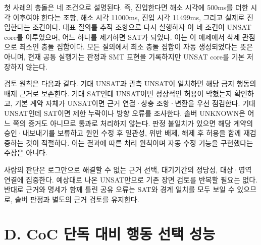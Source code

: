 \documentclass[11pt,a4paper]{article}
\begin{document}
첫 사례의 충돌은 네 조건으로 설명된다. 즉, 진입한다면 해소 시각에 500ms를 더한 시각 이후여야 한다는 조항, 해소 시각 11000ms, 진입 시각 11499ms, 그리고 실제로 진입한다는 조건이다. 대표 질의를 추적 조항으로 다시 실행하자 이 네 조건이 UNSAT core를 이루었으며, 어느 하나를 제거하면 SAT가 되었다. 이는 이 예제에서 삭제 관점으로 최소인 충돌 집합이다. 모든 질의에서 최소 충돌 집합이 자동 생성되었다는 뜻은 아니며, 현재 공통 실행기는 판정과 SMT 표현을 기록하지만 UNSAT core를 기본 저장하지 않는다.\par

검토 원칙은 다음과 같다. 기대 UNSAT과 관측 UNSAT이 일치하면 해당 금지 행동의 배제 근거로 보존한다. 기대 SAT인데 UNSAT이면 정상적인 허용이 막혔는지 확인하고, 기본 계약 자체가 UNSAT이면 근거 연결·상충 조항·변환을 우선 점검한다. 기대 UNSAT인데 SAT이면 제한 누락이나 방향 오류를 조사한다. 솔버 UNKNOWN은 어느 쪽의 증거도 아니므로 통과로 처리하지 않는다. 판정 불일치가 있으면 해당 계약의 승인·내보내기를 보류하고 원인 수정 후 일관성, 위반 배제, 해제 후 허용을 함께 재검증하는 것이 적절하다. 이는 결과에 따른 처리 원칙이며 자동 수정 기능을 구현했다는 주장은 아니다.\par

사람의 판단은 로그만으로 해결할 수 없는 근거 선택, 대기기간의 정당성, 대상·영역 연결에 집중한다. 예상대로 나온 UNSAT만으로 기존 장면 검토를 반복할 필요는 없다. 반대로 근거와 명세가 함께 틀린 공유 오류는 SAT와 경계 일치를 모두 보일 수 있으므로, 솔버 판정과 별도의 근거 검토를 유지한다.\par

\section*{D. CoC 단독 대비 행동 선택 성능}
\end{document}

